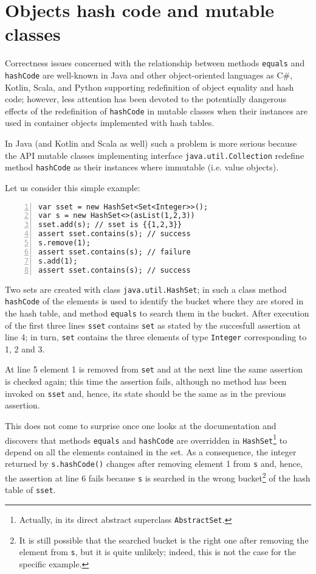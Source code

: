 \section{Objects hash code and mutable classes}

Correctness issues concerned with the relationship between methods \lstinline{equals} and \lstinline{hashCode} are well-known
in Java \cite{Bloch18,OkanoHSON19} and other object-oriented languages as C\#, Kotlin, Scala, and Python supporting redefinition
of object equality and hash code; however, less attention has been devoted to the potentially dangerous effects of the redefinition of 
\lstinline{hashCode} in mutable classes when their instances are used in container objects implemented with hash tables.

In Java (and Kotlin and Scala as well)  such a problem is more serious because the API mutable classes implementing interface \lstinline{java.util.Collection} redefine method \lstinline{hashCode} as their instances where immutable (i.e. value objects).

Let us consider this simple example:
\begin{lstlisting}[numbers=left]
var sset = new HashSet<Set<Integer>>();
var s = new HashSet<>(asList(1,2,3))
sset.add(s); // sset is {{1,2,3}}
assert sset.contains(s); // success
s.remove(1);
assert sset.contains(s); // failure
s.add(1);
assert sset.contains(s); // success
\end{lstlisting}
Two sets are created with class \lstinline{java.util.HashSet}; in such a class method \lstinline{hashCode} of the elements is used to identify the
bucket where they are stored in the hash table, and method \lstinline{equals} to search them in the bucket.
After execution of the first three lines \lstinline{sset} contains \lstinline{set} as stated by the succesfull assertion at line 4; in turn, \lstinline{set}
contains the three elements of type \lstinline{Integer} corresponding to 1, 2 and 3.

At line 5 element 1 is removed from \lstinline{set} and at the next line the same assertion is checked again; this time the assertion fails, although no method has been invoked on \lstinline{sset} and, hence, its state should be the same as in the previous assertion.

This does not come to surprise once one looks at the documentation and discovers that methods \lstinline{equals} and \lstinline{hashCode} are overridden in \lstinline{HashSet}\footnote{Actually, in its direct abstract superclass \lstinline{AbstractSet}.} to depend on all the elements contained in the set. As a consequence, the integer returned by  \lstinline{s.hashCode()} changes after removing element 1 from \lstinline{s} and, hence, the assertion at line 6 fails because \lstinline{s} is searched in the wrong bucket\footnote{It is still possible that the searched bucket is the right one after removing the element from \lstinline{s}, but it is quite unlikely; indeed, this is not the case for the specific example.} of the hash table of \lstinline{sset}.

